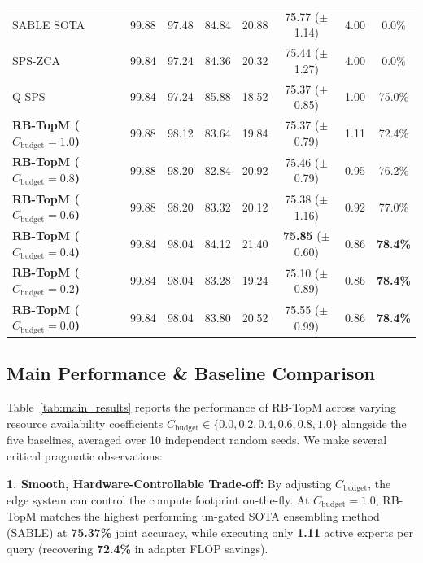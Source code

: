 \begin{table}[t]
\begin{center}
\begin{footnotesize}
\begin{sc}
{\begin{tabular}{lccccccc}
SABLE SOTA & 99.88 & 97.48 & 84.84 & 20.88 & 75.77 ($\pm$1.14) & 4.00 & 0.0\% \\
SPS-ZCA & 99.84 & 97.24 & 84.36 & 20.32 & 75.44 ($\pm$1.27) & 4.00 & 0.0\% \\
Q-SPS & 99.84 & 97.24 & 85.88 & 18.52 & 75.37 ($\pm$0.85) & 1.00 & 75.0\% \\
\midrule
\textbf{RB-TopM ($C_{\text{budget}} = 1.0$)} & 99.88 & 98.12 & 83.64 & 19.84 & 75.37 ($\pm$0.79) & 1.11 & 72.4\% \\
\textbf{RB-TopM ($C_{\text{budget}} = 0.8$)} & 99.88 & 98.20 & 82.84 & 20.92 & 75.46 ($\pm$0.79) & 0.95 & 76.2\% \\
\textbf{RB-TopM ($C_{\text{budget}} = 0.6$)} & 99.88 & 98.20 & 83.32 & 20.12 & 75.38 ($\pm$1.16) & 0.92 & 77.0\% \\
\textbf{RB-TopM ($C_{\text{budget}} = 0.4$)} & 99.84 & 98.04 & 84.12 & 21.40 & \textbf{75.85} ($\pm$0.60) & 0.86 & \textbf{78.4\%} \\
\textbf{RB-TopM ($C_{\text{budget}} = 0.2$)} & 99.84 & 98.04 & 83.28 & 19.24 & 75.10 ($\pm$0.89) & 0.86 & \textbf{78.4\%} \\
\textbf{RB-TopM ($C_{\text{budget}} = 0.0$)} & 99.84 & 98.04 & 83.80 & 20.52 & 75.55 ($\pm$0.99) & 0.86 & \textbf{78.4\%} \\
\bottomrule
\end{tabular}%
}
\end{sc}
\end{footnotesize}
\end{center}
\vskip -0.1in
\end{table}

\subsection{Main Performance \& Baseline Comparison}
Table~\ref{tab:main_results} reports the performance of RB-TopM across varying resource availability coefficients $C_{\text{budget}} \in \{0.0, 0.2, 0.4, 0.6, 0.8, 1.0\}$ alongside the five baselines, averaged over 10 independent random seeds. We make several critical pragmatic observations:

\textbf{1. Smooth, Hardware-Controllable Trade-off:} By adjusting $C_{\text{budget}}$, the edge system can control the compute footprint on-the-fly. At $C_{\text{budget}} = 1.0$, RB-TopM matches the highest performing un-gated SOTA ensembling method (SABLE) at \textbf{75.37\%} joint accuracy, while executing only \textbf{1.11} active experts per query (recovering \textbf{72.4\%} in adapter FLOP savings). 

